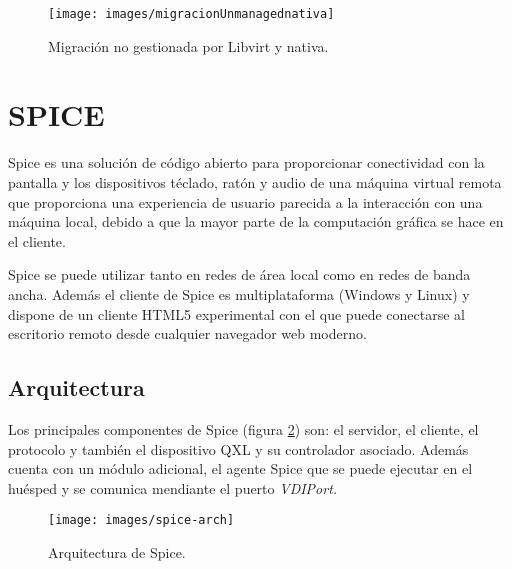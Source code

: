 \documentclass[spanisheDIVcalc,twoside,parskip-,pointlessnumbers,final]{scrbook}
\begin{document}
\begin{itemize}
\begin{figure}[htpb]
\begin{centering}
\texttt{[image: images/migracionUnmanagednativa]}
\par\end{centering}

\caption{Migración no gestionada por Libvirt y nativa.}
\label{migracion nativa no gestionada por libvirt}

\end{figure}


\end{itemize}

\section{SPICE}

Spice es una solución de código abierto para proporcionar conectividad
con la pantalla y los dispositivos téclado, ratón y audio de una máquina
virtual remota que proporciona una experiencia de usuario parecida
a la interacción con una máquina local, debido a que la mayor parte
de la computación gráfica se hace en el cliente. 

Spice se puede utilizar tanto en redes de área local como en redes
de banda ancha. Además el cliente de Spice es multiplataforma (Windows
y Linux) y dispone de un cliente HTML5 experimental con el que puede
conectarse al escritorio remoto desde cualquier navegador web moderno.


\subsection{Arquitectura}

Los principales componentes de Spice (figura \ref{arquitectura de spice})
son: el servidor, el cliente, el protocolo y también el dispositivo
QXL y su controlador asociado. Además cuenta con un módulo adicional,
el agente Spice que se puede ejecutar en el huésped y se comunica
mendiante el puerto \emph{VDIPort.}

\begin{figure}[htpb]
\begin{centering}
\texttt{[image: images/spice-arch]}
\par\end{centering}

\caption{Arquitectura de Spice.}
\label{arquitectura de spice}

\end{figure}
\end{document}
